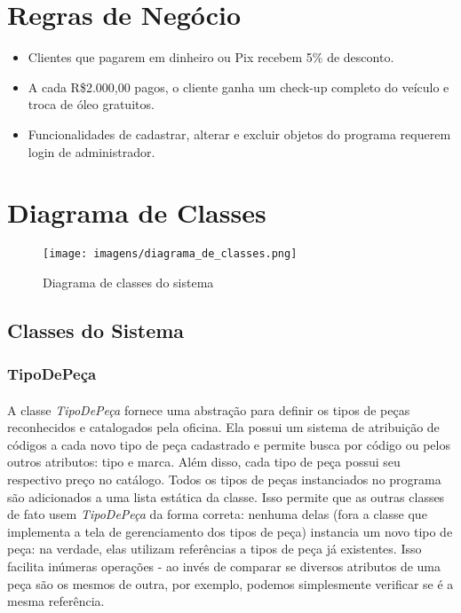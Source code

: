 \documentclass[a4paper,12pt]{article}
\begin{document}
\section{Regras de Negócio}
\begin{itemize}[noitemsep]
    \item Clientes que pagarem em dinheiro ou Pix recebem 5\% de desconto.
    \item A cada R\$2.000,00 pagos, o cliente ganha um check-up completo do veículo e troca de óleo gratuitos.
    \item Funcionalidades de cadastrar, alterar e excluir objetos do programa requerem login de administrador.
\end{itemize}

\section{Diagrama de Classes}
\begin{figure}[H]
    \centering
    \texttt{[image: imagens/diagrama\_de\_classes.png]}
    \caption{Diagrama de classes do sistema}
\end{figure}

\subsection{Classes do Sistema}

\subsubsection{TipoDePeça}
\paragraph{}
A classe \textit{TipoDePeça} fornece uma abstração para definir os tipos de peças reconhecidos e catalogados pela oficina. Ela possui um sistema de atribuição de códigos a cada novo tipo de peça cadastrado e permite busca por código ou pelos outros atributos: tipo e marca. Além disso, cada tipo de peça possui seu respectivo preço no catálogo. Todos os tipos de peças instanciados no programa são adicionados a uma lista estática da classe. Isso permite que as outras classes de fato usem \textit{TipoDePeça} da forma correta: nenhuma delas (fora a classe que implementa a tela de gerenciamento dos tipos de peça) instancia um novo tipo de peça: na verdade, elas utilizam referências a tipos de peça já existentes. Isso facilita inúmeras operações - ao invés de comparar se diversos atributos de uma peça são os mesmos de outra, por exemplo, podemos simplesmente verificar se é a mesma referência.
\end{document}
